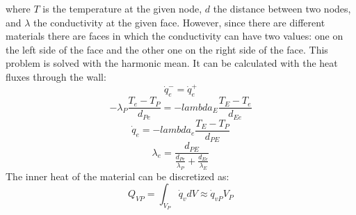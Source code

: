 where $T$ is the temperature at the given node, $d$ the distance between two nodes, and $\lambda$ the conductivity at the given face.
However, since there are different materials there are faces in which the conductivity can have two values: one on the left side of the face and the other one on the right side of the face. This problem is solved with the harmonic mean. It can be calculated with the heat fluxes through the wall:
\begin{equation*}
\dot{q}_{e}^{-}=\dot{q}_{e}^{+}
\end{equation*}
\begin{equation*}
-\lambda_{P}\frac{T_{e}-T_{P}}{d_{Pe}}=-lambda_{E}\frac{T_{E}-T_{e}}{d_{Ee}}
\end{equation*}
\begin{equation*}
	\dot{q}_{e}=-lambda_{e}\frac{T_{E}-T_{P}}{d_{PE}}
\end{equation*}
\begin{equation}
\lambda_{e}=\frac{d_{PE}}{\frac{d_{Pe}}{\lambda_{P}}+\frac{d_{Ee}}{\lambda_{E}}}
\end{equation}
The inner heat of the material can be discretized as:
\begin{equation}
Q_{VP}=\int_{V_{P}}^{}\dot{q}_{v}dV\approx\dot{q}_{vP}V_{P}
\end{equation}

